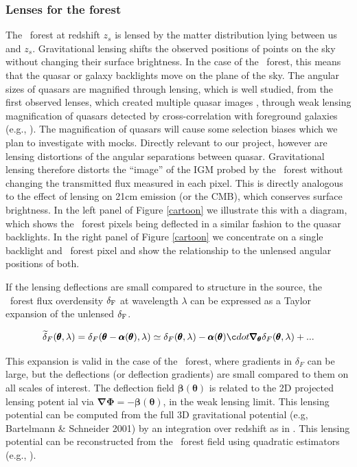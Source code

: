 \subsubsection{Lenses for the forest}

The \lya\ forest at redshift $z_{s}$ is lensed by the matter
distribution lying between us and $z_{s}$. Gravitational lensing
shifts the observed positions of points on the sky without changing
their surface brightness.  In the case of the \lya\ forest, this means
that the quasar or galaxy backlights move on the plane of the sky.
The angular sizes of quasars are magnified through lensing, which is
well studied, from the first observed lenses, which created multiple
quasar images \citep{walsh1979}, through weak lensing
magnification of quasars detected by cross-correlation with foreground
galaxies (e.g., \cite{scranton2005}).  The magnification of
quasars will cause some selection biases which we plan to investigate
with mocks. Directly relevant to our project, however
are lensing distortions of the angular separations between quasar. 
  Gravitational lensing therefore distorts the ``image'' of the 
IGM probed by the \lya\ forest without
changing the transmitted flux measured in each pixel. This is directly
analogous to the effect of lensing on 21cm emission (or the CMB),
which conserves surface brightness.  In
the left panel of Figure \ref{cartoon} we
illustrate this with a diagram, which shows the \lya\ forest pixels
being deflected in a similar fashion to the quasar backlights. In
the right panel of 
Figure \ref{cartoon} we concentrate on a single backlight and \lya\
forest pixel and show the relationship to the unlensed angular
positions of both.


If the lensing deflections are small
compared to structure in the source, the \lya\ forest 
flux overdensity $\delta_{\rm F}$  at wavelength $\lambda$ can
be expressed as a Taylor expansion of the unlensed $\delta_{\rm F}$.

\begin{equation}
\widetilde{\delta}_{F}({ \pmb {\theta}},\lambda)=
{\delta_{F}}({ \pmb {\theta}} - {\pmb { \alpha}}({\pmb {\theta}}) ,\lambda)
\simeq {\delta_{F}} ({\pmb{\theta}},\lambda) - {\pmb {\alpha}}({\pmb{\theta}})\c
dot
{\pmb{\nabla_{\theta}}} \delta_{F} ({\pmb{\theta}},\lambda) + ...
\label{taylor}
\end{equation}

 This expansion is  valid in the case of the \lya\ forest, where gradients
in $\delta_{F}$ can be large, but the deflections (or deflection gradients) 
are small compared to them on all scales of interest. The deflection field
${\pmb {\beta}}( {\pmb {\theta}})$ is related to the 2D projected lensing potent
ial via
${\pmb {\nabla \Phi}} =- {\pmb {\beta}}({\pmb {\theta}} )$,
in the weak lensing limit. This lensing potential can be
computed from the full 3D gravitational
potential (e.g, Bartelmann \& Schneider 2001) by an integration
over redshift as in .
This lensing potential
can  be reconstructed from the \lya\ forest field using 
quadratic estimators (e.g., \cite{okamoto}).

